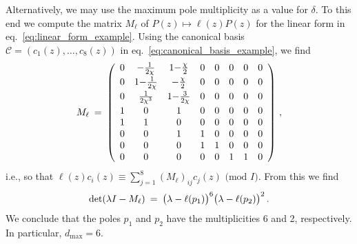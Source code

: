 \documentclass[dvipsnames,preprint,12pt,sort&compress]{elsarticle}
\begin{document}
Alternatively, we may use the maximum pole multiplicity as a
value for $\delta$. To this end we compute the matrix
$M_\ell$ of $P(z) \mapsto \ell(z) P(z)$ for the linear form
in eq.~\eqref{eq:linear_form_example}. Using the canonical basis
$\mathcal{C} = (c_1(z), \ldots, c_8(z))$ in eq.~\eqref{eq:canonical_basis_example},
we find
\begin{equation}
M_\ell
\hspace{0.8mm}=\hspace{0.8mm} \left(
\begin{array}{cccccccc}
 0 & -\frac{1}{2\chi} & 1{-}\frac{\chi}{2} & 0 & 0 & 0 & 0 & 0 \\[1mm]
 0 & 1{-}\frac{1}{2\chi} & -\frac{\chi}{2} & 0 & 0 & 0 & 0 & 0 \\[1mm]
 0 & \frac{1}{2\chi^3} & 1{-}\frac{3}{2\chi} & 0 & 0 & 0 & 0 & 0 \\[1mm]
 1 & 0 & 1 & 0 & 0 & 0 & 0 & 0 \\
 1 & 1 & 0 & 0 & 0 & 0 & 0 & 0 \\
 0 & 0 & 1 & 1 & 0 & 0 & 0 & 0 \\
 0 & 0 & 0 & 1 & 1 & 0 & 0 & 0 \\
 0 & 0 & 0 & 0 & 0 & 1 & 1 & 0 \\
\end{array}
\right) \,,
\end{equation}
i.e., so that $\ell(z) c_i (z) \equiv \sum_{j=1}^8 (M_\ell)_{ij} c_j (z) \mbox{ (mod $I$)}$.
From this we find
\begin{equation}
\det (\lambda I - M_\ell) \hspace{0.8mm}=\hspace{0.8mm} \big(\lambda - \ell(p_1)\big)^6 \big(\lambda - \ell(p_2)\big)^2 \,.
\label{eq:eigenvalues_of_M_l_example}
\end{equation}
We conclude that the poles $p_1$ and $p_2$ have the multiplicities 6 and 2,
respectively. In particular, $d_\mathrm{max} = 6$.
\end{document}
